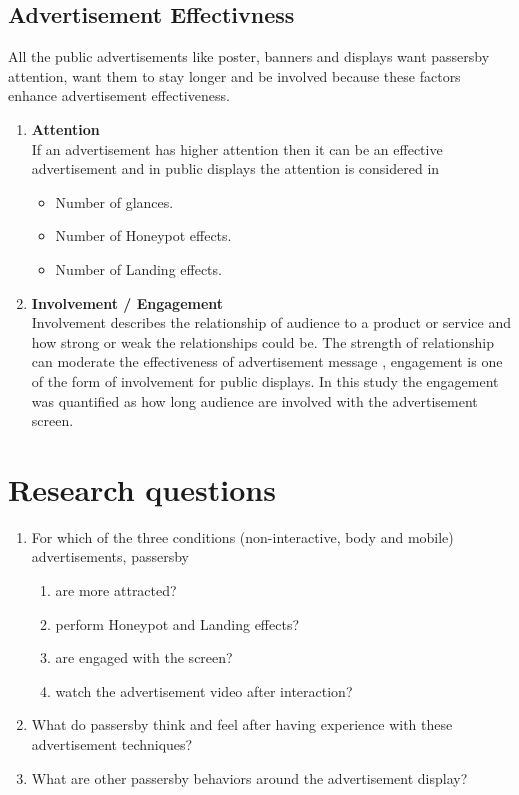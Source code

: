 \subsection{Advertisement Effectivness}
All the public advertisements like poster, banners and displays want passersby attention, want them to stay longer and be involved because these factors enhance advertisement effectiveness.

\begin{enumerate}
\item \textbf{Attention} \\
If an advertisement has higher attention then it can be an effective advertisement\cite{add_effectivenss} and in public displays the attention is considered in 
\begin{itemize}
\item Number of glances.
\item Number of Honeypot effects.
\item Number of Landing effects.
\end{itemize}

\item \textbf{Involvement / Engagement} \\
Involvement describes the relationship of audience to a product or service and how strong or weak the relationships could be\cite{involment}. The strength of relationship can moderate the effectiveness of advertisement message \cite{ audience_involvement}, engagement is one of the form of involvement for public displays. In this study the engagement was quantified as how long audience are involved with the advertisement screen.
\end{enumerate}

\section{Research questions}
\begin{enumerate}

\item	For which of the three conditions (non-interactive, body and mobile) advertisements, passersby 

\begin{enumerate}
\item	are more attracted?
\item	perform Honeypot and Landing effects?
\item	are engaged with the screen?
\item	watch the advertisement video after interaction?
\end{enumerate}

\item   What do passersby think and feel after having experience with these advertisement techniques?
\item   What are other passersby behaviors around the advertisement display?
\end{enumerate}




